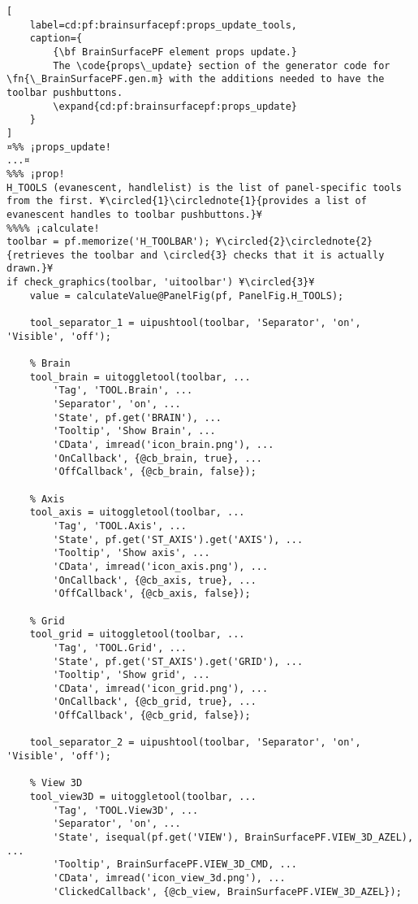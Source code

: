 \documentclass{tufte-handout}
\begin{document}
\begin{lstlisting}[
	label=cd:pf:brainsurfacepf:props_update_tools,
	caption={
		{\bf BrainSurfacePF element props update.}
		The \code{props\_update} section of the generator code for \fn{\_BrainSurfacePF.gen.m} with the additions needed to have the toolbar pushbuttons.
		\expand{cd:pf:brainsurfacepf:props_update}
	}
]
¤%% ¡props_update!
...¤
%%% ¡prop!
H_TOOLS (evanescent, handlelist) is the list of panel-specific tools from the first. ¥\circled{1}\circlednote{1}{provides a list of evanescent handles to toolbar pushbuttons.}¥
%%%% ¡calculate!
toolbar = pf.memorize('H_TOOLBAR'); ¥\circled{2}\circlednote{2}{retrieves the toolbar and \circled{3} checks that it is actually drawn.}¥
if check_graphics(toolbar, 'uitoolbar') ¥\circled{3}¥
    value = calculateValue@PanelFig(pf, PanelFig.H_TOOLS);
    
    tool_separator_1 = uipushtool(toolbar, 'Separator', 'on', 'Visible', 'off');

    % Brain
    tool_brain = uitoggletool(toolbar, ...
        'Tag', 'TOOL.Brain', ...
        'Separator', 'on', ...
        'State', pf.get('BRAIN'), ...
        'Tooltip', 'Show Brain', ...
        'CData', imread('icon_brain.png'), ...
        'OnCallback', {@cb_brain, true}, ...
        'OffCallback', {@cb_brain, false});

    % Axis
    tool_axis = uitoggletool(toolbar, ...
        'Tag', 'TOOL.Axis', ...
        'State', pf.get('ST_AXIS').get('AXIS'), ...
        'Tooltip', 'Show axis', ...
        'CData', imread('icon_axis.png'), ...
        'OnCallback', {@cb_axis, true}, ...
        'OffCallback', {@cb_axis, false});

    % Grid
    tool_grid = uitoggletool(toolbar, ...
        'Tag', 'TOOL.Grid', ...
        'State', pf.get('ST_AXIS').get('GRID'), ...
        'Tooltip', 'Show grid', ...
        'CData', imread('icon_grid.png'), ...
        'OnCallback', {@cb_grid, true}, ...
        'OffCallback', {@cb_grid, false});
        
    tool_separator_2 = uipushtool(toolbar, 'Separator', 'on', 'Visible', 'off');

    % View 3D
    tool_view3D = uitoggletool(toolbar, ...
        'Tag', 'TOOL.View3D', ...
        'Separator', 'on', ... 
        'State', isequal(pf.get('VIEW'), BrainSurfacePF.VIEW_3D_AZEL), ...
        'Tooltip', BrainSurfacePF.VIEW_3D_CMD, ...
        'CData', imread('icon_view_3d.png'), ...
        'ClickedCallback', {@cb_view, BrainSurfacePF.VIEW_3D_AZEL});


\end{lstlisting}
\end{document}
